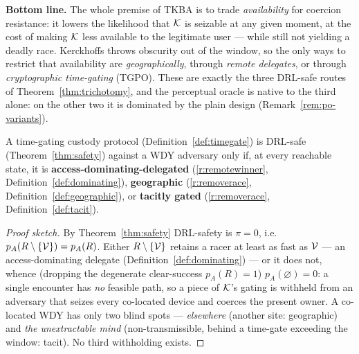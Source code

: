 \noindent\textbf{Bottom line.} The whole premise of TKBA is to trade
\emph{availability} for coercion resistance: it lowers the likelihood that $\mathcal{K}$ is
seizable at any given moment, at the cost of making $\mathcal{K}$ less available to the
legitimate user --- while still not yielding a deadly race. Kerckhoffs throws
obscurity out of the window, so the only ways to restrict that availability are
\emph{geographically}, through \emph{remote delegates}, or through
\emph{cryptographic time-gating} (TGPO). These are exactly the three DRL-safe
routes of Theorem~\ref{thm:trichotomy}, and the perceptual oracle is native to the
third alone: on the other two it is dominated by the plain design
(Remark~\ref{rem:po-variants}).

\begin{theorem}\label{thm:trichotomy}
A time-gating custody protocol (Definition~\ref{def:timegate}) is DRL-safe
(Theorem~\ref{thm:safety}) against a WDY adversary only if, at every reachable
state, it is
\textbf{access-dominating-delegated} (\ref{r:remotewinner}, Definition~\ref{def:dominating}),
\textbf{geographic} (\ref{r:removerace}, Definition~\ref{def:geographic}), or \textbf{tacitly
gated} (\ref{r:removerace}, Definition~\ref{def:tacit}).
\end{theorem}

\begin{proof}[Proof sketch]
By Theorem~\ref{thm:safety} DRL-safety is $\pi = 0$, i.e.\
$p_A(R\setminus\{\mathcal{V}\}) = p_A(R)$. Either $R\setminus\{\mathcal{V}\}$ retains a
racer at least as fast as $\mathcal{V}$ --- an access-dominating delegate
(Definition~\ref{def:dominating}) --- or it does not, whence (dropping the
degenerate clear-success $p_A(R)=1$) $p_A(\varnothing)=0$: a single encounter has
\emph{no} feasible path, so a piece of $\mathcal{K}$'s gating is withheld from an adversary
that seizes every co-located device and coerces the present owner. A co-located
WDY has only two blind spots --- \emph{elsewhere} (another site: geographic) and
\emph{the unextractable mind} (non-transmissible, behind a time-gate exceeding the
window: tacit). No third withholding exists.
\end{proof}


